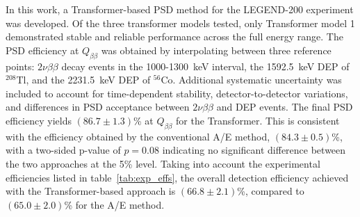 In this work, a Transformer-based PSD method for the LEGEND-200 experiment was developed. Of the three transformer models tested, only Transformer model 1 demonstrated stable and reliable performance across the full energy range. The PSD efficiency at $Q_{\beta \beta}$ was obtained by interpolating between three reference points: $2 \nu \beta \beta$ decay events in the 1000-1300~keV interval, the 1592.5~keV DEP of $^{208}$Tl, and the 2231.5~keV DEP of $^{56}$Co. Additional systematic uncertainty was included to account for time-dependent stability, detector-to-detector variations, and differences in PSD acceptance between $2 \nu \beta \beta$ and DEP events. The final PSD efficiency yields $(86.7 \pm 1.3)$\% at $Q_{\beta \beta}$ for the Transformer. This is consistent with the efficiency obtained by the conventional A/E method, $(84.3 \pm 0.5)$\%, with a two-sided p-value of $p = 0.08$ indicating no significant difference between the two approaches at the 5\% level. 
Taking into account the experimental efficiencies listed in table~\ref{tab:exp_effs}, the overall detection efficiency achieved with the Transformer-based approach is $(66.8 \pm 2.1)$\%, compared to $(65.0 \pm 2.0)$\% for the A/E method. 